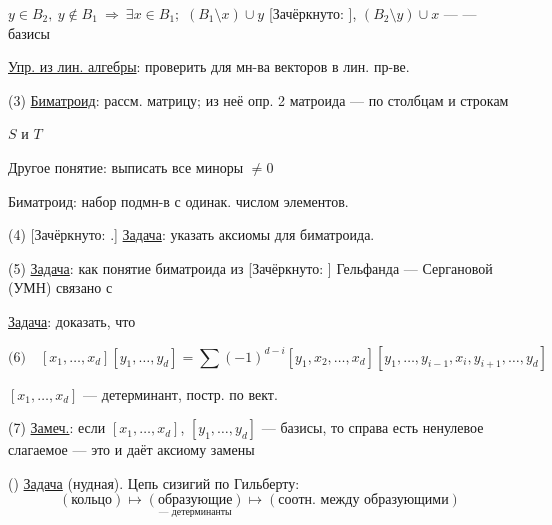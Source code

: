 $y\in B_2,\ y\notin B_1\ \Rightarrow\ \exists x\in B_1;$
$(B_1\setminus x)\cup y$
[Зачёркнуто: ],
$(B_2\setminus y)\cup x$ —
\newline
— базисы

\underline{Упр. из лин. алгебры}: проверить для мн-ва векторов в лин. пр-ве.

(3) \underline{Биматроид}: рассм. матрицу; из неё опр. 2 матроида — по столбцам
и строкам

$S$ и $T$

Другое понятие: выписать все миноры $\ne0$

Биматроид: набор подмн-в с одинак. числом элементов.

(4) [Зачёркнуто: .]
\underline{Задача}: указать аксиомы для биматроида.


(5) \underline{Задача}: как понятие биматроида из
[Зачёркнуто: ]
Гельфанда — Сергановой (УМН)
связано с 

\underline{Задача}: доказать, что

\begin{equation*}
\text{(6)}\quad
[x_1,\ldots,x_d][y_1,\ldots,y_d]
=\sum(-1)^{d-i}[y_1,x_2,\ldots,x_d]
[y_1,\ldots,y_{i-1},x_i,y_{i+1},\ldots,y_d]
\end{equation*}

$[x_1,\ldots,x_d]$ — детерминант, постр. по вект.

(7) \underline{Замеч.}: если $[x_1,\ldots,x_d]$, $[y_1,\ldots,y_d]$ — базисы, то справа есть
ненулевое слагаемое — это и даёт аксиому замены

()
\underline{Задача} (нудная). Цепь сизигий по Гильберту:
\begin{equation*}
(\text{кольцо})\longmapsto
\underset{\text{— детерминанты}}{(\text{образующие})}
\longmapsto (\text{соотн. между образующими})
\end{equation*}

